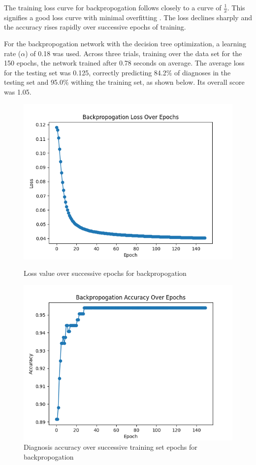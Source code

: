 \documentclass[12pt]{article}
\begin{document}
    The training loss curve for backpropogation follows closely to a curve of \(\frac{1}{x}\).  This signifies a good loss curve with minimal
    overfitting \cite{goodLoss}.  The loss declines sharply and the accuracy rises rapidly over successive epochs of training.
    \pagebreak

    For the backpropogation network with the decision tree optimization, a learning rate (\(\alpha\)) of 0.18 was used.  Across three trials, training over the data set for
    the 150 epochs, the network trained after 0.78 seconds on average.  The average loss for the testing set was 0.125, 
    correctly predicting 84.2\% of diagnoses in the testing set and 95.0\% withing the training set, as shown below.
    Its overall score was 1.05.
    \begin{figure}[h]
        \begin{minipage}{0.48\textwidth}
            \centering
            \includegraphics[width=.9\linewidth]{decisionlosses.png}
            \caption{Loss value over successive epochs for backpropogation}
        \end{minipage}\hfill
        \begin{minipage}{0.48\textwidth}
            \centering
            \includegraphics[width=.9\linewidth]{decisionaccuracy.png}
            \caption{Diagnosis accuracy over successive training set epochs for backpropogation}
        \end{minipage}
    \end{figure}
\end{document}
